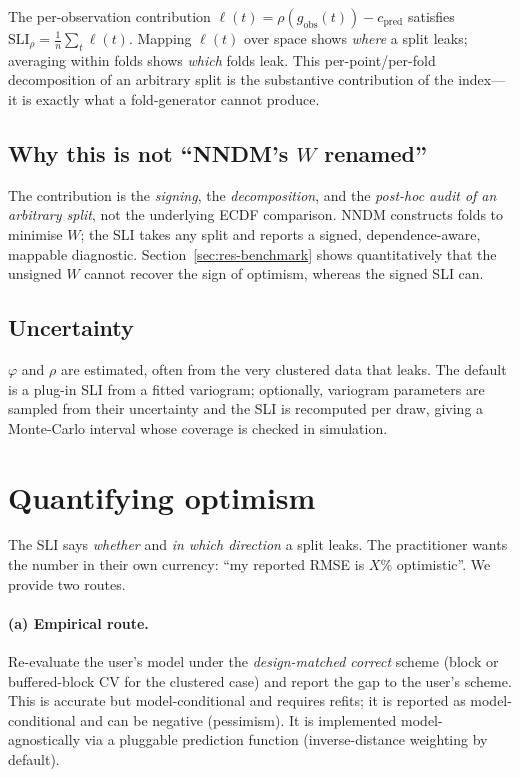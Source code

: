 \documentclass[11pt,a4paper]{article}
\newcommand{\SLI}{\mathrm{SLI}}
\newcommand{\SLIrho}{\SLI_{\rho}}
\begin{document}
The per-observation contribution $\ell(t)=\rho(g_{\text{obs}}(t))-c_{\text{pred}}$
satisfies $\SLIrho=\tfrac1n\sum_t\ell(t)$. Mapping $\ell(t)$ over space shows
\emph{where} a split leaks; averaging within folds shows \emph{which} folds leak.
This per-point/per-fold decomposition of an arbitrary split is the substantive
contribution of the index---it is exactly what a fold-generator cannot produce.

\subsection{Why this is not ``NNDM's \texorpdfstring{$W$}{W} renamed''}

The contribution is the \emph{signing}, the \emph{decomposition}, and the
\emph{post-hoc audit of an arbitrary split}, not the underlying ECDF comparison.
NNDM constructs folds to minimise $W$; the SLI takes any split and reports a signed,
dependence-aware, mappable diagnostic. Section~\ref{sec:res-benchmark} shows
quantitatively that the unsigned $W$ cannot recover the sign of optimism, whereas
the signed SLI can.

\subsection{Uncertainty}

$\varphi$ and $\rho$ are estimated, often from the very clustered data that leaks.
The default is a plug-in SLI from a fitted variogram; optionally, variogram
parameters are sampled from their uncertainty and the SLI is recomputed per draw,
giving a Monte-Carlo interval whose coverage is checked in simulation.

\section{Quantifying optimism}\label{sec:optimism}

The SLI says \emph{whether} and \emph{in which direction} a split leaks. The
practitioner wants the number in their own currency: ``my reported RMSE is $X\%$
optimistic''. We provide two routes.

\paragraph{(a) Empirical route.} Re-evaluate the user's model under the
\emph{design-matched correct} scheme (block or buffered-block CV for the clustered
case) and report the gap to the user's scheme. This is accurate but
model-conditional and requires refits; it is reported as model-conditional and can
be negative (pessimism). It is implemented model-agnostically via a pluggable
prediction function (inverse-distance weighting by default).
\end{document}
